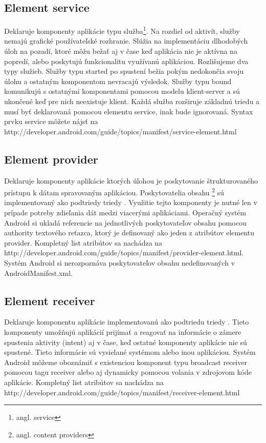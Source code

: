 \subsection{Element service}
Deklaruje komponenty aplikácie typu služba\footnote{angl. service}. Na rozdiel od aktivít, služby nemajú grafické používateľské rozhranie. Slúžia na implementáciu dlhodobých úloh na pozadí, ktoré môžu bežať aj v čase keď aplikácia nie je aktívna na popredí, alebo poskytujú funkcionalitu využívanú aplikáciou. Rozlišujeme dva typy služieb. Služby typu started po spustení bežia pokým nedokončia svoju úlohu a ostatným komponentom nevracajú výsledok. Služby typu bound komunikujú s ostatnými komponentami pomocou modelu klient-server a sú ukončené keď pre nich neexistuje klient.  Každá služba rozširuje základnú triedu  a musí byť deklarovaná pomocou elementu service, inak bude ignorovaná. Syntax prvku service môžete nájsť na http://developer.android.com/guide/topics/manifest/service-element.html
\subsection{Element provider}
Deklaruje komponenty aplikácie ktorých úlohou je poskytovanie štrukturovaného prístupu k dátam spravovaným aplikáciou. Poskytovatelia obsahu \footnote{angl. content providers} sú implementovaný ako podtriedy triedy . Využitie tejto komponenty je nutné len v prípade potreby zdieľania dát medzi viacerými aplikáciami. Operačný systém Android si ukladá referencie na jednotlivých poskytovateľov obsahu pomocou authority textového reťazca, ktorý je definovaný ako jeden z atribútov elementu provider. Kompletný list atribútov sa nachádza na http://developer.android.com/guide/topics/manifest/provider-element.html. Systém Android si nerozpoznáva poskytovateľov obsahu nedefinovaných v AndroidManifest.xml.
\subsection{Element receiver}
Deklaruje komponentu aplikácie implementovanú ako podtriedu triedy . Tieto komponenty umožňujú aplikácií prijímať a reagovať na informácie o zámere spustenia aktivity (intent) aj v čase, keď ostatné komponenty aplikácie nie sú spustené. Tieto informácie sú vysielané systémom alebo inou aplikáciou. Systém Android môžeme oboznámiť s existenciou komponent typu broadcast receiver pomocou tagu receiver alebo aj dynamicky pomocou volania  v zdrojovom kóde aplikácie. Kompletný list atribútov sa nachádza na http://developer.android.com/guide/topics/manifest/receiver-element.html

